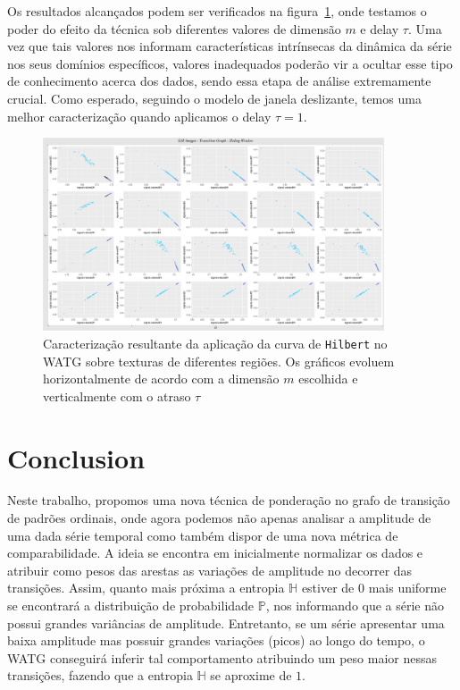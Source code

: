 \documentclass[12pt]{article}
\begin{document}
Os resultados alcançados podem ser verificados na figura~\ref{fig:Regions}, onde testamos o poder do efeito da técnica sob diferentes valores de dimensão $m$ e delay $\tau$.
Uma vez que tais valores nos informam características intrínsecas da dinâmica da série nos seus domínios específicos, valores inadequados poderão vir a ocultar esse tipo de conhecimento acerca dos dados, sendo essa etapa de análise extremamente crucial. 
Como esperado, seguindo o modelo de janela deslizante, temos uma melhor caracterização quando aplicamos o delay $\tau = 1$.

\begin{figure}[hbt]
	\centering
	\includegraphics[width=0.9\textwidth]{Figures/transitionGraphHilbert.png}
    \caption{Caracterização resultante da aplicação da curva de \texttt{Hilbert} no WATG sobre texturas de diferentes regiões. Os gráficos evoluem horizontalmente de acordo com a dimensão $m$ escolhida e verticalmente com o atraso $\tau$}
    \label{fig:Regions}
\end{figure}

\section{Conclusion}\label{Conclusion}

Neste trabalho, propomos uma nova técnica de ponderação no grafo de transição de padrões ordinais, onde agora podemos não apenas analisar a amplitude de uma dada série temporal como também dispor de uma nova métrica de comparabilidade.
A ideia se encontra em inicialmente normalizar os dados e atribuir como pesos das arestas as variações de amplitude no decorrer das transições.
Assim, quanto mais próxima a entropia $\mathbb{H}$ estiver de $0$ mais uniforme se encontrará a distribuição de probabilidade $\mathbb{P}$, nos informando que a série não possui grandes variâncias de amplitude.
Entretanto, se um série apresentar uma baixa amplitude mas possuir grandes variações (picos) ao longo do tempo, o WATG conseguirá inferir tal comportamento atribuindo um peso maior nessas transições, fazendo que a entropia $\mathbb{H}$ se aproxime de $1$.
\end{document}
